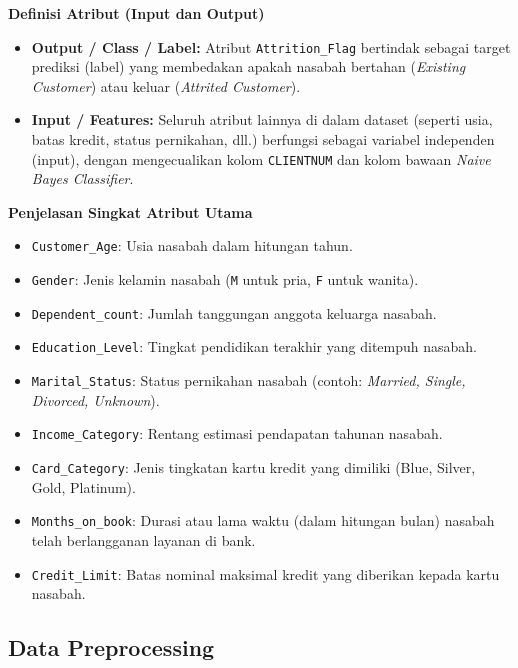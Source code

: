 \documentclass[a4paper,oneside,11pt]{book}
\begin{document}
\textbf{Definisi Atribut (Input dan Output)}
\begin{itemize}
    \item \textbf{Output / Class / Label:} Atribut \texttt{Attrition\_Flag} bertindak sebagai target prediksi (label) yang membedakan apakah nasabah bertahan (\textit{Existing Customer}) atau keluar (\textit{Attrited Customer}).
    \item \textbf{Input / Features:} Seluruh atribut lainnya di dalam dataset (seperti usia, batas kredit, status pernikahan, dll.) berfungsi sebagai variabel independen (input), dengan mengecualikan kolom \texttt{CLIENTNUM} dan kolom bawaan \textit{Naive Bayes Classifier}.
\end{itemize}

\textbf{Penjelasan Singkat Atribut Utama}
\begin{itemize}
    \item \texttt{Customer\_Age}: Usia nasabah dalam hitungan tahun.
    \item \texttt{Gender}: Jenis kelamin nasabah (\texttt{M} untuk pria, \texttt{F} untuk wanita).
    \item \texttt{Dependent\_count}: Jumlah tanggungan anggota keluarga nasabah.
    \item \texttt{Education\_Level}: Tingkat pendidikan terakhir yang ditempuh nasabah.
    \item \texttt{Marital\_Status}: Status pernikahan nasabah (contoh: \textit{Married, Single, Divorced, Unknown}).
    \item \texttt{Income\_Category}: Rentang estimasi pendapatan tahunan nasabah.
    \item \texttt{Card\_Category}: Jenis tingkatan kartu kredit yang dimiliki (Blue, Silver, Gold, Platinum).
    \item \texttt{Months\_on\_book}: Durasi atau lama waktu (dalam hitungan bulan) nasabah telah berlangganan layanan di bank.
    \item \texttt{Credit\_Limit}: Batas nominal maksimal kredit yang diberikan kepada kartu nasabah.
\end{itemize}


\subsection{Data Preprocessing}
\end{document}
